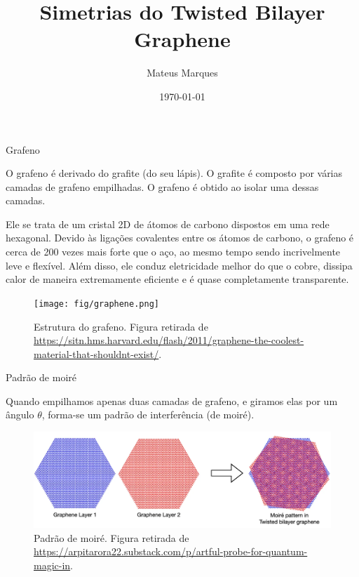 \documentclass[10pt,aspectratio=169,xcolor={table,dvipsnames,usenames}]{beamer}
\title[Simetrias do Twisted Bilayer Graphene]{\LARGE{Simetrias do Twisted Bilayer Graphene}}
\author[Mateus Marques]{
\large{Mateus Marques
}}
\date{\today}
\begin{document}
\begin{frame}
  \titlepage
\end{frame}


\begin{frame}{Grafeno}

O grafeno é derivado do grafite (do seu lápis). O grafite é composto por várias camadas de grafeno empilhadas. O grafeno é obtido ao isolar uma dessas camadas.

Ele se trata de um cristal 2D de átomos de carbono dispostos em uma rede hexagonal. Devido às ligações covalentes entre os átomos de carbono, o grafeno é cerca de 200 vezes mais forte que o aço, ao mesmo tempo sendo incrivelmente leve e flexível. Além disso, ele conduz eletricidade melhor do que o cobre, dissipa calor de maneira extremamente eficiente e é quase completamente transparente.

\begin{figure}[H]
\centering
\texttt{[image: fig/graphene.png]}
\caption{Estrutura do grafeno. Figura retirada de \url{https://sitn.hms.harvard.edu/flash/2011/graphene-the-coolest-material-that-shouldnt-exist/}.}
\label{fig:graphene}
\end{figure}

\end{frame}


\begin{frame}{Padrão de moiré}

Quando empilhamos apenas duas camadas de grafeno, e giramos elas por um ângulo $\theta$, forma-se um padrão de interferência (de moiré).

\begin{figure}[H]
\centering
\includegraphics[height=0.32\linewidth]{fig/moire.png}
\caption{Padrão de moiré. Figura retirada de \url{https://arpitarora22.substack.com/p/artful-probe-for-quantum-magic-in}.}
\label{fig:moire}
\end{figure}

\end{frame}
\end{document}
